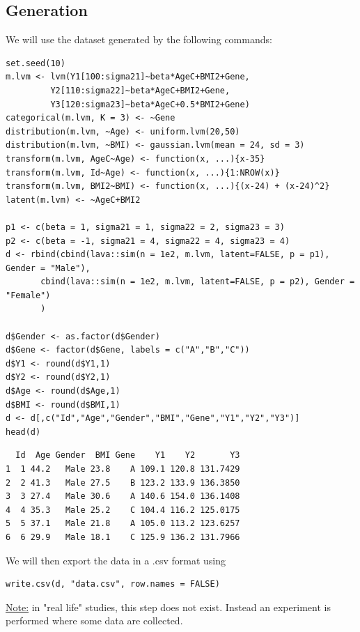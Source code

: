 \documentclass[12pt]{article}
\begin{document}
\subsection{Generation}
\label{sec:org14a87e9}
\lstset{style=code-tiny}
We will use the dataset generated by the following commands:
\lstset{language=r,label= ,caption= ,captionpos=b,numbers=none}
\begin{lstlisting}
set.seed(10)
m.lvm <- lvm(Y1[100:sigma21]~beta*AgeC+BMI2+Gene,
	     Y2[110:sigma22]~beta*AgeC+BMI2+Gene,
	     Y3[120:sigma23]~beta*AgeC+0.5*BMI2+Gene)
categorical(m.lvm, K = 3) <- ~Gene
distribution(m.lvm, ~Age) <- uniform.lvm(20,50)
distribution(m.lvm, ~BMI) <- gaussian.lvm(mean = 24, sd = 3)
transform(m.lvm, AgeC~Age) <- function(x, ...){x-35}
transform(m.lvm, Id~Age) <- function(x, ...){1:NROW(x)}
transform(m.lvm, BMI2~BMI) <- function(x, ...){(x-24) + (x-24)^2}
latent(m.lvm) <- ~AgeC+BMI2

p1 <- c(beta = 1, sigma21 = 1, sigma22 = 2, sigma23 = 3)
p2 <- c(beta = -1, sigma21 = 4, sigma22 = 4, sigma23 = 4)
d <- rbind(cbind(lava::sim(n = 1e2, m.lvm, latent=FALSE, p = p1), Gender = "Male"),
	   cbind(lava::sim(n = 1e2, m.lvm, latent=FALSE, p = p2), Gender = "Female")
	   )

d$Gender <- as.factor(d$Gender)
d$Gene <- factor(d$Gene, labels = c("A","B","C"))
d$Y1 <- round(d$Y1,1)
d$Y2 <- round(d$Y2,1)
d$Age <- round(d$Age,1)
d$BMI <- round(d$BMI,1)
d <- d[,c("Id","Age","Gender","BMI","Gene","Y1","Y2","Y3")]
head(d)
\end{lstlisting}

\begin{verbatim}
  Id  Age Gender  BMI Gene    Y1    Y2       Y3
1  1 44.2   Male 23.8    A 109.1 120.8 131.7429
2  2 41.3   Male 27.5    B 123.2 133.9 136.3850
3  3 27.4   Male 30.6    A 140.6 154.0 136.1408
4  4 35.3   Male 25.2    C 104.4 116.2 125.0175
5  5 37.1   Male 21.8    A 105.0 113.2 123.6257
6  6 29.9   Male 18.1    C 125.9 136.2 131.7966
\end{verbatim}
\lstset{style=code-small}

We will then export the data in a .csv format using 
\lstset{language=r,label= ,caption= ,captionpos=b,numbers=none}
\begin{lstlisting}
write.csv(d, "data.csv", row.names = FALSE)
\end{lstlisting}

\bigskip

\uline{Note:} in "real life" studies, this step does not exist. Instead an
experiment is performed where some data are collected.
\end{document}
